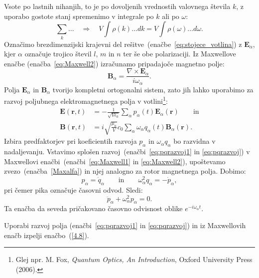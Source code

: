 Vsote po lastnih nihanjih, to je po dovoljenih vrednostih valovnega števila $k$,
z uporabo gostote stanj spremenimo v integrale po $k$ ali po $\omega$:
\begin{equation}
\sum_{k}\ldots \quad \Rightarrow \quad V\int\rho(k)\ldots dk=V\int\rho(\omega)\ldots d\omega.
\label{4.5}
\end{equation}
Označimo brezdimenzijski krajevni del rešitve~(enačbe~\ref{eq:stojece_votlina}) z 
$\mathbf{E}_{\alpha}$, kjer $\alpha$
označuje trojico števil $l$, $m$ in $n$ ter še obe polarizaciji. Iz
Maxwellove enačbe (enačba~\ref{eq:Maxwell2}) izračunamo pripadajoče magnetno polje:
\begin{equation}
\mathbf{B}_{\alpha} = \frac{\nabla\times\mathbf{E}_{\alpha}}{i\omega_\alpha}.
\label{Maxalfa}
\end{equation}
Polja $\mathbf{E}_{\alpha}$ in $\mathbf{B}_{\alpha}$ tvorijo kompletni ortogonalni
sistem, zato jih lahko uporabimo za razvoj poljubnega elektromagnetnega polja v 
votlini\footnote{Glej npr. M. Fox, {\it Quantum Optics, 
An Introduction}, Oxford University Press (2006).}:
\begin{align}
\mathbf{E}(\mathbf{r},t) & =  -\frac{1}{\sqrt{V\epsilon_{0}}}
\sum_{\alpha}p_{\alpha}(t)\mathbf{E}_{\alpha}(\mathbf{r}) \qquad \mathrm{in} \label{eq:pqrazvoj1}\\
\mathbf{B}(\mathbf{r},t) & =  i\sqrt{\frac{\mu_{0}}{V}}c_0\sum_{\alpha}
\omega_{\alpha}q_{\alpha}(t)\mathbf{B}_{\alpha}(\mathbf{r}).
\label{eq:pqrazvoj}
\end{align}
Izbira predfaktorjev pri koeficientih razvoja $p_\alpha$ in $\omega_\alpha q_\alpha$ bo razvidna
v nadaljevanju. Vstavimo splošen razvoj~(enačbi~\ref{eq:pqrazvoj1} in \ref{eq:pqrazvoj}) v 
Maxwellovi enačbi~(enačbi~\ref{eq:Maxwell1} in \ref{eq:Maxwell2}), 
upoštevamo zvezo~(enačba~\ref{Maxalfa}) in njej analogno za rotor magnetnega polja. Dobimo:
\begin{equation}
p_{\alpha}=\dot{q}_{\alpha} \qquad \mathrm{in} \qquad 
\omega_{\alpha}^{2}q_{\alpha}=-\dot{p}_{\alpha},
\label{4.7}
\end{equation}
pri čemer pika označuje časovni odvod. Sledi:
\begin{equation}
\ddot{p}_{\alpha}+\omega_{\alpha}^{2}p_{\alpha}=0.
\label{4.8}
\end{equation}
Ta enačba da seveda pričakovano časovno odvisnost oblike $e^{-i \omega_\alpha t}$.

\begin{naloga}
 Uporabi razvoj polja (enačbi~\ref{eq:pqrazvoj1} in \ref{eq:pqrazvoj}) 
 in iz Maxwellovih enačb izpelji
 enačbo~(\ref{4.8}).
\end{naloga}

